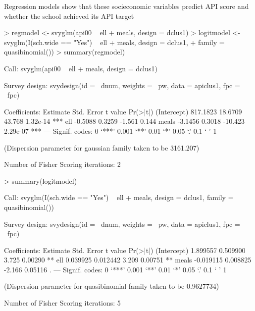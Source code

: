 \documentclass{article}
\begin{document}
Regression models show that these socieconomic variables predict API score and whether the school achieved its API target
\begin{Schunk}
\begin{Sinput}
> regmodel <- svyglm(api00 ~ ell + meals, design = dclus1)
> logitmodel <- svyglm(I(sch.wide == "Yes") ~ ell + meals, design = dclus1, 
+     family = quasibinomial())
> summary(regmodel)
\end{Sinput}
\begin{Soutput}
Call:
svyglm(api00 ~ ell + meals, design = dclus1)

Survey design:
svydesign(id = ~dnum, weights = ~pw, data = apiclus1, fpc = ~fpc)

Coefficients:
            Estimate Std. Error t value Pr(>|t|)    
(Intercept) 817.1823    18.6709  43.768 1.32e-14 ***
ell          -0.5088     0.3259  -1.561    0.144    
meals        -3.1456     0.3018 -10.423 2.29e-07 ***
---
Signif. codes:  0 ‘***’ 0.001 ‘**’ 0.01 ‘*’ 0.05 ‘.’ 0.1 ‘ ’ 1 

(Dispersion parameter for gaussian family taken to be 3161.207)

Number of Fisher Scoring iterations: 2
\end{Soutput}
\begin{Sinput}
> summary(logitmodel)
\end{Sinput}
\begin{Soutput}
Call:
svyglm(I(sch.wide == "Yes") ~ ell + meals, design = dclus1, family = quasibinomial())

Survey design:
svydesign(id = ~dnum, weights = ~pw, data = apiclus1, fpc = ~fpc)

Coefficients:
             Estimate Std. Error t value Pr(>|t|)   
(Intercept)  1.899557   0.509900   3.725  0.00290 **
ell          0.039925   0.012442   3.209  0.00751 **
meals       -0.019115   0.008825  -2.166  0.05116 . 
---
Signif. codes:  0 ‘***’ 0.001 ‘**’ 0.01 ‘*’ 0.05 ‘.’ 0.1 ‘ ’ 1 

(Dispersion parameter for quasibinomial family taken to be 0.9627734)

Number of Fisher Scoring iterations: 5
\end{Soutput}
\end{Schunk}
\end{document}
